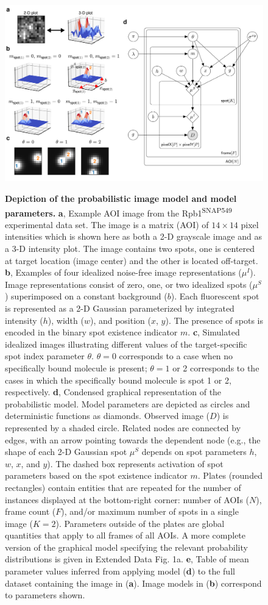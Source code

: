 \begin{figure}[h]
\centering
\includegraphics[width=\textwidth]{figures/figure2/figure2.png}
\label{fig:tapqir_model}
\caption{\textbf{Depiction of the probabilistic image model and model parameters.} \textbf{a}, Example AOI image from the Rpb1\textsuperscript{SNAP549} experimental data set. The image is a matrix (AOI) of $14 \times 14$ pixel intensities which is shown here as both a 2-D grayscale image and as a 3-D intensity plot. The image contains two spots, one is centered at target location (image center) and the other is located off-target. \textbf{b}, Examples of four idealized noise-free image representations ($\mu^I$). Image representations consist of zero, one, or two idealized spots ($\mu^S$) superimposed on a constant background ($b$). Each fluorescent spot is represented as a 2-D Gaussian parameterized by integrated intensity ($h$), width ($w$), and position ($x$, $y$). The presence of spots is encoded in the binary spot existence indicator $m$. \textbf{c}, Simulated idealized images illustrating different values of the target-specific spot index parameter $\theta$. $\theta = 0$ corresponds to a case when no specifically bound molecule is present; $\theta = 1$ or 2 corresponds to the cases in which the specifically bound molecule is spot 1 or 2, respectively. \textbf{d}, Condensed graphical representation of the probabilistic model. Model parameters are depicted as circles and deterministic functions as diamonds. Observed image ($D$) is represented by a shaded circle. Related nodes are connected by edges, with an arrow pointing towards the dependent node (e.g., the shape of each 2-D Gaussian spot $\mu^S$ depends on spot parameters $h$, $w$, $x$, and $y$). The dashed box represents activation of spot parameters based on the spot existence indicator $m$. Plates (rounded rectangles) contain entities that are repeated for the number of instances displayed at the bottom-right corner: number of AOIs ($N$), frame count ($F$), and/or maximum number of spots in a single image ($K=2$). Parameters outside of the plates are global quantities that apply to all frames of all AOIs. A more complete version of the graphical model specifying the relevant probability distributions is given in Extended Data Fig. 1a. \textbf{e}, Table of mean parameter values inferred from applying model (\textbf{d}) to the full dataset containing the image in (\textbf{a}). Image models in (\textbf{b}) correspond to parameters shown. }

\end{figure}
